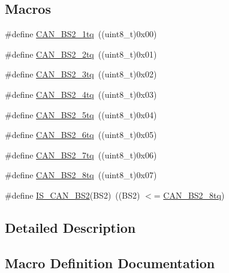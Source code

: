 \subsection*{Macros}
\begin{DoxyCompactItemize}
\item 
\#define \hyperlink{group___c_a_n__time__quantum__in__bit__segment__2_gad9af25a3f61df7b09b8d6a5e81d8027e}{C\+A\+N\+\_\+\+B\+S2\+\_\+1tq}~((uint8\+\_\+t)0x00)
\item 
\#define \hyperlink{group___c_a_n__time__quantum__in__bit__segment__2_gac43d82f74990620499f1998187ff3602}{C\+A\+N\+\_\+\+B\+S2\+\_\+2tq}~((uint8\+\_\+t)0x01)
\item 
\#define \hyperlink{group___c_a_n__time__quantum__in__bit__segment__2_gab3d325ce4a5d0eb1ee8ee50ad4ec7e49}{C\+A\+N\+\_\+\+B\+S2\+\_\+3tq}~((uint8\+\_\+t)0x02)
\item 
\#define \hyperlink{group___c_a_n__time__quantum__in__bit__segment__2_gaaff1c1cdd809f185299971c6437f32a0}{C\+A\+N\+\_\+\+B\+S2\+\_\+4tq}~((uint8\+\_\+t)0x03)
\item 
\#define \hyperlink{group___c_a_n__time__quantum__in__bit__segment__2_ga89feba32bcc2e909f858d535edaad101}{C\+A\+N\+\_\+\+B\+S2\+\_\+5tq}~((uint8\+\_\+t)0x04)
\item 
\#define \hyperlink{group___c_a_n__time__quantum__in__bit__segment__2_ga72c3245b794d3238763d1ec319bf386f}{C\+A\+N\+\_\+\+B\+S2\+\_\+6tq}~((uint8\+\_\+t)0x05)
\item 
\#define \hyperlink{group___c_a_n__time__quantum__in__bit__segment__2_ga8005adaef02fb90e400909de08dec031}{C\+A\+N\+\_\+\+B\+S2\+\_\+7tq}~((uint8\+\_\+t)0x06)
\item 
\#define \hyperlink{group___c_a_n__time__quantum__in__bit__segment__2_gaad8dcbb266cf5074bfb67bd7108597c6}{C\+A\+N\+\_\+\+B\+S2\+\_\+8tq}~((uint8\+\_\+t)0x07)
\item 
\#define \hyperlink{group___c_a_n__time__quantum__in__bit__segment__2_ga3f5620b1d094dbd7d2fb8d16f4b187a9}{I\+S\+\_\+\+C\+A\+N\+\_\+\+B\+S2}(B\+S2)~((B\+S2) $<$= \hyperlink{group___c_a_n__time__quantum__in__bit__segment__2_gaad8dcbb266cf5074bfb67bd7108597c6}{C\+A\+N\+\_\+\+B\+S2\+\_\+8tq})
\end{DoxyCompactItemize}


\subsection{Detailed Description}


\subsection{Macro Definition Documentation}
\mbox{\label{group___c_a_n__time__quantum__in__bit__segment__2_gad9af25a3f61df7b09b8d6a5e81d8027e}} 
